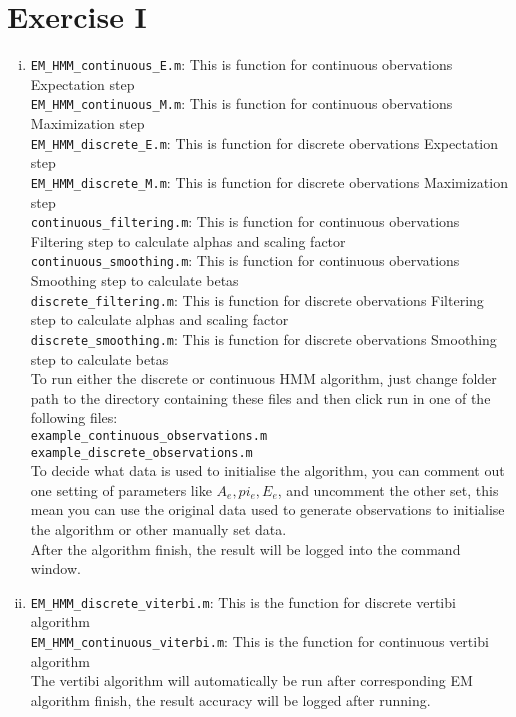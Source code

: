 \documentclass[12pt,twoside]{article}
\begin{document}



\section{Exercise I}
\begin{enumerate}[(i)]
\item
\verb|EM_HMM_continuous_E.m|: This is function for continuous obervations Expectation step\\
\verb|EM_HMM_continuous_M.m|: This is function for continuous obervations Maximization step\\
\verb|EM_HMM_discrete_E.m|: This is function for discrete obervations Expectation step\\
\verb|EM_HMM_discrete_M.m|: This is function for discrete obervations Maximization step\\
\verb|continuous_filtering.m|: This is function for continuous obervations Filtering step to calculate alphas and scaling factor\\
\verb|continuous_smoothing.m|: This is function for continuous obervations Smoothing step to calculate betas\\
\verb|discrete_filtering.m|: This is function for discrete obervations Filtering step to calculate alphas and scaling factor\\
\verb|discrete_smoothing.m|: This is function for discrete obervations Smoothing step to calculate betas\\
To run either the discrete or continuous HMM algorithm, just change folder path to the directory containing these files and then click run in one of the following files:\\
\verb|example_continuous_observations.m|\\
\verb|example_discrete_observations.m|\\
To decide what data is used to initialise the algorithm, you can comment out one setting of parameters like $A_e, pi_e, E_e$, and uncomment the other set, this mean you can use the original data used to generate observations to initialise the algorithm or other manually set data.\\
After the algorithm finish, the result will be logged into the command window.
\item
\verb|EM_HMM_discrete_viterbi.m|: This is the function for discrete vertibi algorithm\\
\verb|EM_HMM_continuous_viterbi.m|: This is the function for continuous vertibi algorithm\\
The vertibi algorithm will automatically be run after corresponding EM algorithm finish, the result accuracy will be logged after running.
\end{enumerate}
\end{document}
